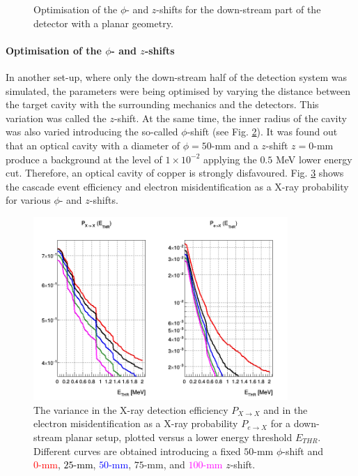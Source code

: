 \documentclass[12pt]{article}
\begin{document}
\begin{figure}[!htbp]
\begin{subfigure}{.485\textwidth}
	\label{fig:zshift}
\end{subfigure}	
\caption{Optimisation of the $\phi$- and $z$-shifts for the down-stream part of the detector with a planar geometry.}
\label{fig:planarsetup}
\end{figure}


\paragraph{Optimisation of the $\phi$- and $z$-shifts}
In another set-up, where only the down-stream half of the detection system was simulated, the parameters were being optimised by varying the distance between the target cavity with the surrounding mechanics and the detectors. This variation was called the $z$-shift. At the same time, the inner radius of the cavity was also varied introducing the so-called $\phi$-shift (see Fig. \ref{fig:planarsetup}). It was found out that an optical cavity with a diameter of $\phi = 50$-mm and a $z$-shift $z = 0$-mm produce a background at the level of $1 \times 10^{-2}$ applying the $0.5$ MeV lower energy cut. Therefore, an optical cavity of copper is strongly disfavoured. Fig. \ref{fig:misid} shows the cascade event efficiency and electron misidentification as a X-ray probability for various $\phi$- and $z$-shifts.
\begin{figure}[!htbp]
\centering
\includegraphics[width=0.86\textwidth]{img/phi_z_shifts.png}
\caption{The variance in the X-ray detection efficiency $P_{X{\rightarrow}X}$ and in the electron misidentification as a X-ray probability $P_{e \rightarrow X}$ for a down-stream planar setup, plotted versus a lower energy threshold $E_{THR}$. Different curves are obtained introducing a fixed $50$-mm $\phi$-shift and \textcolor{red}{$0$-mm}, \textcolor{black}{$25$-mm}, \textcolor{blue}{$50$-mm}, \textcolor{forestgreen(web)}{$75$-mm}, and \textcolor{magenta}{$100$-mm} $z$-shift.}
\label{fig:misid}
\end{figure}
\end{document}
